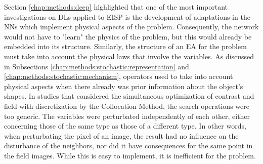 			Section \ref{chap:methods:deep} highlighted that one of the most important investigations on DLs applied to EISP is the development of adaptations in the NNs which implement physical aspects of the problem. Consequently, the network would not have to "learn" the physics of the problem, but this would already be embedded into its structure. Similarly, the structure of an EA for the problem must take into account the physical laws that involve the variables. As discussed in Subsections \ref{chap:methods:stochastic:representation} and \ref{chap:methods:stochastic:mechanism}, operators used to take into account physical aspects when there already was prior information about the object's shapes. In studies that considered the simultaneous optimization of contrast and field with discretization by the Collocation Method, the search operations were too generic. The variables were perturbated independently of each other, either concerning those of the same type as those of a different type. In other words, when perturbating the pixel of an image, the result had no influence on the disturbance of the neighbors, nor did it have consequences for the same point in the field images. While this is easy to implement, it is inefficient for the problem.
			
